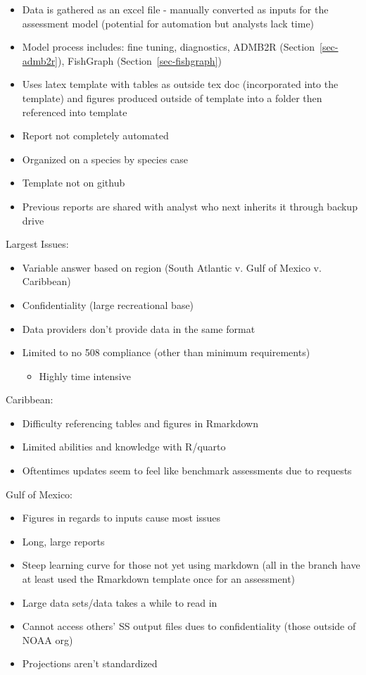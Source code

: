 \documentclass[
  letterpaper,
  oneside,
  open=any]{scrbook}
\providecommand{\tightlist}{%
  \setlength{\itemsep}{0pt}\setlength{\parskip}{0pt}}\usepackage{longtable,booktabs,array}
\begin{document}
\begin{itemize}
\item
  Data is gathered as an excel file - manually converted as inputs for
  the assessment model (potential for automation but analysts lack time)
\item
  Model process includes: fine tuning, diagnostics, ADMB2R
  (Section~\ref{sec-admb2r}), FishGraph (Section~\ref{sec-fishgraph})
\item
  Uses latex template with tables as outside tex doc (incorporated into
  the template) and figures produced outside of template into a folder
  then referenced into template
\item
  Report not completely automated
\item
  Organized on a species by species case
\item
  Template not on github
\item
  Previous reports are shared with analyst who next inherits it through
  backup drive
\end{itemize}

Largest Issues:

\begin{itemize}
\item
  Variable answer based on region (South Atlantic v. Gulf of Mexico v.
  Caribbean)
\item
  Confidentiality (large recreational base)
\item
  Data providers don't provide data in the same format
\item
  Limited to no 508 compliance (other than minimum requirements)

  \begin{itemize}
  \tightlist
  \item
    Highly time intensive
  \end{itemize}
\end{itemize}

Caribbean:

\begin{itemize}
\item
  Difficulty referencing tables and figures in Rmarkdown
\item
  Limited abilities and knowledge with R/quarto
\item
  Oftentimes updates seem to feel like benchmark assessments due to
  requests
\end{itemize}

Gulf of Mexico:

\begin{itemize}
\item
  Figures in regards to inputs cause most issues
\item
  Long, large reports
\item
  Steep learning curve for those not yet using markdown (all in the
  branch have at least used the Rmarkdown template once for an
  assessment)
\item
  Large data sets/data takes a while to read in
\item
  Cannot access others' SS output files dues to confidentiality (those
  outside of NOAA org)
\item
  Projections aren't standardized
\end{itemize}
\end{document}
